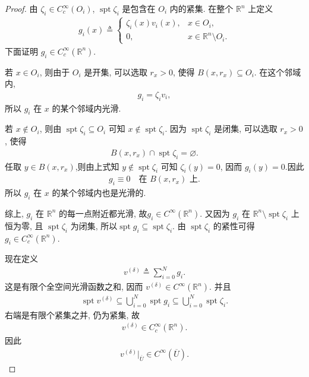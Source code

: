 \documentclass[../../main.tex]{subfiles}
\begin{document}
\begin{proof}
由 $\zeta_i\in C_c^\infty(O_i)$, $\operatorname{spt}\zeta_i$ 是包含在 $O_i$ 内的紧集. 在整个 $\mathbb{R}^{n}$ 上定义
\begin{align*}
g_i(x)\triangleq
\begin{cases}
\zeta_i(x)v_i(x),&x\in O_i,\\
0,&x\in\mathbb{R}^{n}\setminus O_i.
\end{cases}
\end{align*}
下面证明 $g_i\in C_c^\infty(\mathbb{R}^{n})$.

若 $x\in O_i$, 则由于 $O_i$ 是开集, 可以选取 $r_x>0$, 使得 $B(x,r_x)\subseteq O_i$. 在这个邻域内,
\begin{align*}
g_i=\zeta_i v_i,
\end{align*}
所以 $g_i$ 在 $x$ 的某个邻域内光滑.

若 $x\notin O_i$, 则由 $\operatorname{spt}\zeta_i\subseteq O_i$ 可知 $x\notin \operatorname{spt}\zeta_i$. 因为 $\operatorname{spt}\zeta_i$ 是闭集, 可以选取 $r_x>0$, 使得
\begin{align*}
B(x,r_x)\cap \operatorname{spt}\zeta_i=\varnothing.
\end{align*}
任取 $y\in B(x,r_x)$,则由上式知 $y\notin\operatorname{spt}\zeta_i$ 可知 $\zeta_i(y)=0$, 因而 $g_i(y)=0$.因此
\begin{align*}
g_i\equiv0\quad\text{在 }B(x,r_x)\text{ 上}.
\end{align*}
所以 $g_i$ 在 $x$ 的某个邻域内也是光滑的. 

综上, $g_i$ 在 $\mathbb{R}^{n}$ 的每一点附近都光滑, 故$g_i\in C^\infty(\mathbb{R}^{n}).$
又因为 $g_i$ 在 $\mathbb{R}^{n}\setminus \operatorname{spt}\zeta_i$ 上恒为零, 且 $\operatorname{spt}\zeta_i$ 为闭集, 所以$\operatorname{spt}g_i\subseteq \operatorname{spt}\zeta_i.$
由 $\operatorname{spt}\zeta_i$ 的紧性可得 $g_i\in C_c^\infty(\mathbb{R}^{n})$.

现在定义
\begin{align*}
v^{(\delta)}\triangleq\sum\limits_{i=0}^{N}g_i.
\end{align*}
这是有限个全空间光滑函数之和, 因而
$v^{(\delta)}\in C^\infty(\mathbb{R}^{n}).$
并且
\begin{align*}
\operatorname{spt}v^{(\delta)}
\subseteq
\bigcup\limits_{i=0}^{N}\operatorname{spt}g_i
\subseteq
\bigcup\limits_{i=0}^{N}\operatorname{spt}\zeta_i.
\end{align*}
右端是有限个紧集之并, 仍为紧集, 故
\begin{align*}
v^{(\delta)}\in C_c^\infty(\mathbb{R}^{n}).
\end{align*}
因此
\begin{align*}
v^{(\delta)}|_{\overline{U}}\in C^\infty(\overline{U}).
\end{align*}


\end{proof}
\end{document}
